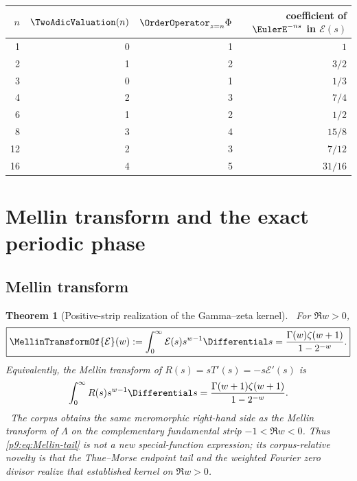 \documentclass[11pt]{article}
\numberwithin{equation}{section}
\newtheorem{theorem}{Theorem}[section]
\theoremstyle{definition}
\theoremstyle{remark}
\begin{document}
\begin{center}
\begin{tabular}{@{}rrrr@{}}
\toprule
$n$ & $\TwoAdicValuation(n)$ & $\OrderOperator_{z=n}\Phi$ & coefficient of $\EulerE^{-ns}$ in $\mathcal E(s)$\\
\midrule
1 & 0 & 1 & $1$\\
2 & 1 & 2 & $3/2$\\
3 & 0 & 1 & $1/3$\\
4 & 2 & 3 & $7/4$\\
6 & 1 & 2 & $1/2$\\
8 & 3 & 4 & $15/8$\\
12 & 2 & 3 & $7/12$\\
16 & 4 & 5 & $31/16$\\
\bottomrule
\end{tabular}
\end{center}

\section{Mellin transform and the exact periodic phase}
\label{p9:sec:Mellin}

\subsection{Mellin transform}

\begin{theorem}[Positive-strip realization of the Gamma--zeta kernel]
\label{p9:thm:Mellin-tail}
\statusN\ For $\Re w>0$,
\begin{equation}
 \boxed{
 \MellinTransformOf{\mathcal E}(w):=\int_0^\infty\mathcal E(s)s^{w-1}\Differential s
 =\frac{\Gamma(w)\zeta(w+1)}{1-2^{-w}}.}                   \label{p9:eq:Mellin-tail}
\end{equation}
Equivalently, the Mellin transform of $R(s)=sT'(s)=-s\mathcal E'(s)$ is
\begin{equation}
 \int_0^\infty R(s)s^{w-1}\Differential s
 =\frac{\Gamma(w+1)\zeta(w+1)}{1-2^{-w}}.                 \label{p9:eq:Mellin-R}
\end{equation}
\statusE\ The corpus obtains the same meromorphic right-hand side as the Mellin transform
of $\Lambda$ on the complementary fundamental strip $-1<\Re w<0$.  Thus
\eqref{p9:eq:Mellin-tail} is not a new special-function expression; its corpus-relative
novelty is that the Thue--Morse endpoint tail and the weighted Fourier zero divisor realize
that established kernel on $\Re w>0$.
\end{theorem}
\end{document}
